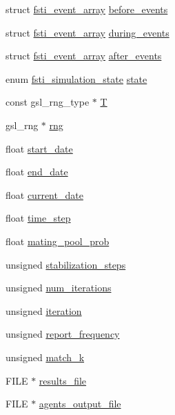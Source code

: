 \begin{DoxyCompactItemize}
\item 
struct \mbox{\hyperlink{structfsti__event__array}{fsti\+\_\+event\+\_\+array}} \mbox{\hyperlink{structfsti__simulation_afdc6cdfba5f8f8a1d72a1c2e1b2775c0}{before\+\_\+events}}
\item 
struct \mbox{\hyperlink{structfsti__event__array}{fsti\+\_\+event\+\_\+array}} \mbox{\hyperlink{structfsti__simulation_ad5f30f66f41c8bd1bb6c12fa2d254132}{during\+\_\+events}}
\item 
struct \mbox{\hyperlink{structfsti__event__array}{fsti\+\_\+event\+\_\+array}} \mbox{\hyperlink{structfsti__simulation_aeecb9bdd114d396d70dcb274eada625c}{after\+\_\+events}}
\item 
enum \mbox{\hyperlink{fsti-simulation_8h_aa4feb4e18e0a72b142f028a7ddf75047}{fsti\+\_\+simulation\+\_\+state}} \mbox{\hyperlink{structfsti__simulation_a235faa3cc9ec5bd16cd89fa80cdadff5}{state}}
\item 
const gsl\+\_\+rng\+\_\+type $\ast$ \mbox{\hyperlink{structfsti__simulation_a9d284bb9be88b621ec2449d02df614dd}{T}}
\item 
gsl\+\_\+rng $\ast$ \mbox{\hyperlink{structfsti__simulation_a3f669aaba3da7bd5a46a4cb8e7c009ce}{rng}}
\item 
float \mbox{\hyperlink{structfsti__simulation_ac5ce36734a8156fec0cf62bcaa56f5a3}{start\+\_\+date}}
\item 
float \mbox{\hyperlink{structfsti__simulation_a5bddb8a23f894397915c43a5770e7fd1}{end\+\_\+date}}
\item 
float \mbox{\hyperlink{structfsti__simulation_a79f4bbb55b32e131cafcdb6697ab4768}{current\+\_\+date}}
\item 
float \mbox{\hyperlink{structfsti__simulation_a650011fbab62704c39b65cdd8cdb3a3d}{time\+\_\+step}}
\item 
float \mbox{\hyperlink{structfsti__simulation_a35c0d7aba210250a4b0d834ed6dfe5c6}{mating\+\_\+pool\+\_\+prob}}
\item 
unsigned \mbox{\hyperlink{structfsti__simulation_aaddd9220a10295d24f5c6a50f7f1727c}{stabilization\+\_\+steps}}
\item 
unsigned \mbox{\hyperlink{structfsti__simulation_a5ec800c5ca8fb82bbdbe45743a3571a9}{num\+\_\+iterations}}
\item 
unsigned \mbox{\hyperlink{structfsti__simulation_a1455e197a5df3af32d96438c784d0bd5}{iteration}}
\item 
unsigned \mbox{\hyperlink{structfsti__simulation_a933d795a18a61dccea12db86da0e120b}{report\+\_\+frequency}}
\item 
unsigned \mbox{\hyperlink{structfsti__simulation_abbe99680ea150fa87b562f12fed6a088}{match\+\_\+k}}
\item 
F\+I\+LE $\ast$ \mbox{\hyperlink{structfsti__simulation_aee76cdc2d8e408930d2801b9d6099c51}{results\+\_\+file}}
\item 
F\+I\+LE $\ast$ \mbox{\hyperlink{structfsti__simulation_ab9a74be6298bbfe4ea5d2bbdbeef3b95}{agents\+\_\+output\+\_\+file}}
\end{DoxyCompactItemize}


